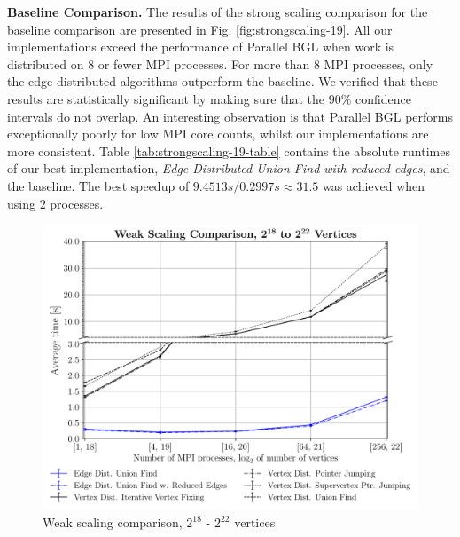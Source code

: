 \documentclass[letterpaper]{article}
\newcommand{\mypar}[1]{{\bf #1.}}
\begin{document}
\begin{table}[!t]
	\centering
	\caption{Runtime results in seconds from strong scaling comparison, $2^{19}$ vertices}
	\label{tab:strongscaling-19-table}
\end{table}

\mypar{Baseline Comparison}
The results of the strong scaling comparison for the baseline comparison are presented in Fig.
\ref{fig:strongscaling-19}. All our implementations exceed the performance of Parallel BGL when work is distributed on
$8$ or fewer MPI processes. For more than $8$ MPI processes, only the edge distributed algorithms outperform the
baseline. We verified that these results are statistically significant by making sure that the $90\%$ confidence
intervals do not overlap. An interesting observation is that Parallel BGL performs exceptionally poorly for low MPI core
counts, whilst our implementations are more consistent. Table \ref{tab:strongscaling-19-table} contains the absolute
runtimes of our best implementation, \emph{Edge Distributed Union Find with reduced edges}, and the baseline. The best
speedup of $9.4513s/0.2997s \approx 31.5$ was achieved when using $2$ processes.

\begin{figure}
  \includegraphics[width=\columnwidth]{../benchmark-results/plots/weakscaling.pdf}
  \caption{Weak scaling comparison, $2^{18}$ - $2^{22}$ vertices}
  \label{fig:weakscaling}
\end{figure}
\end{document}
